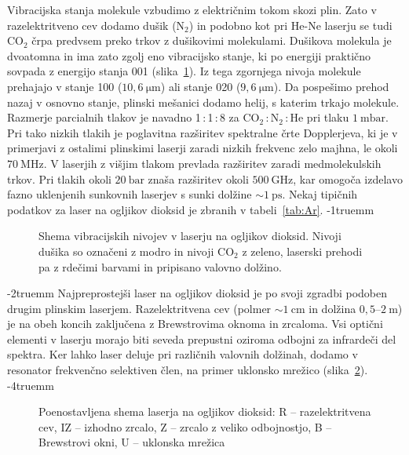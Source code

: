 Vibracijska stanja molekule vzbudimo z električnim tokom skozi plin. 
Zato v razelektritveno cev dodamo dušik (N$_2$) in podobno kot pri He-Ne laserju
se tudi CO$_2$ črpa predvsem preko trkov z dušikovimi molekulami. 
Dušikova molekula je dvoatomna in ima zato zgolj eno vibracijsko stanje, ki po energiji
praktično sovpada z energijo stanja 001 (slika~\ref{fig:CO2E}). Iz tega zgornjega
nivoja molekule prehajajo v stanje 100 ($10,6~\si{\micro\metre}$) ali stanje
020 ($9,6~\si{\micro\metre}$). Da pospešimo prehod nazaj v osnovno stanje, 
plinski mešanici dodamo helij, s katerim trkajo molekule.
Razmerje parcialnih tlakov je navadno 1\,:\,1\,:\,8 za CO$_2$\,:\,N$_2$\,:\,He pri tlaku $1~\si{\milli\bar}$. 
Pri tako nizkih tlakih je poglavitna razširitev spektralne črte Dopplerjeva, 
ki 
je v primerjavi z ostalimi plinskimi laserji zaradi nizkih frekvenc zelo majhna,
le okoli $70~\si{\mega\hertz}$. V laserjih z višjim tlakom 
prevlada razširitev zaradi medmolekulskih trkov. Pri tlakih okoli $20~\si{\bar}$
znaša razširitev okoli $500~\si{\giga\hertz}$, kar omogoča izdelavo fazno uklenjenih 
sunkovnih laserjev s sunki dolžine $\sim 1~\si{\pico\second}$. Nekaj tipičnih podatkov 
za laser na ogljikov dioksid je zbranih v tabeli~\ref{tab:Ar}.
\vglue-1truemm
\begin{figure}[ht]
\centering
\def\svgwidth{90truemm} 

\caption{Shema vibracijskih nivojev v laserju na ogljikov dioksid. 
Nivoji dušika so označeni z modro in nivoji CO$_2$ z zeleno, laserski prehodi 
pa z rdečimi barvami in pripisano valovno dolžino.}
\label{fig:CO2E}
\end{figure}
\vglue-2truemm
Najpreprostejši laser na ogljikov dioksid  
je po svoji zgradbi podoben drugim plinskim laserjem. 
Razelektritvena cev (polmer $\sim 1~\si{\centi\metre}$ 
in dolžina $0,5$--$2~\si{\metre}$) 
je na obeh koncih zaključena z Brewstrovima oknoma in zrcaloma. Vsi optični elementi
v laserju morajo biti seveda prepustni oziroma odbojni za infrardeči del spektra. Ker lahko 
laser deluje pri različnih valovnih dolžinah, dodamo v resonator frekvenčno selektiven
člen, na primer uklonsko mrežico (slika~\ref{fig:CO2S}).
\vglue-4truemm
\begin{figure}[ht]
\centering
\def\svgwidth{90truemm} 

\caption{Poenostavljena shema  laserja na ogljikov dioksid: R -- razelektritvena cev, 
IZ -- izhodno zrcalo, Z -- zrcalo z veliko odbojnostjo, B -- Brewstrovi okni, 
U -- uklonska mrežica
}
\label{fig:CO2S}
\end{figure}

